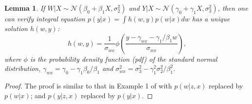 \documentclass[
  12pt]{article}
\newtheorem{lemma}{Lemma}
\def\cN{\mathcal{N}}
\begin{document}
\begin{lemma}
\label{lemma.miao-example}
 If $W|X\sim \cN(\beta_0+\beta_1X,\sigma_{2}^{2})$ and $Y|X\sim \cN(\gamma_0+\gamma_1X,\sigma_{3}^{2})$, then one can verify integral equation $p(y|x)=\int h(w,y)p(w|x)dw$ has a unique solution $h(w,y)$:
\begin{equation}\label{eq.true_solution}
    h(w,y)=\frac{1}{\sigma_{wx}}\phi \left( \frac{y-\gamma_{wx}-\gamma_1/\beta_1 w}{\sigma_{wx}} \right),
\end{equation}
where $\phi$ is the probability density function (pdf) of the standard normal distribution, $\gamma_{wx}=\gamma_{0}-\gamma_{1}\beta_{0}/\beta_{1}$ and $\sigma_{wx}^2=\sigma_3^2-\gamma_1^2\sigma_2^2/\beta_1^2$.
\end{lemma}
\begin{proof}
The proof is similar to that in Example 1 of \cite{miao2018identifying} with $p(w|z, x)$ replaced by $p(w|x)$; and $p(y|z, x)$ replaced by $p(y|x)$.
\end{proof}

\end{document}
